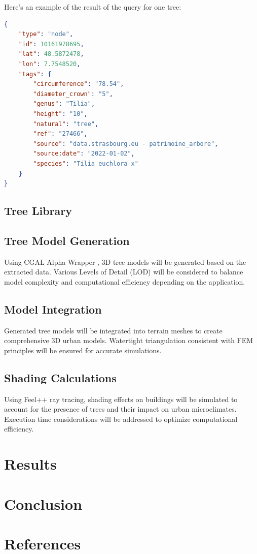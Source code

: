 \documentclass[12pt]{article}
\begin{document}
\newpage
Here's an example of the result of the query for one tree:

\begin{lstlisting}[language=json,firstnumber=1]
{
    "type": "node",
    "id": 10161978695,
    "lat": 48.5872478,
    "lon": 7.7548520,
    "tags": {
        "circumference": "78.54",
        "diameter_crown": "5",
        "genus": "Tilia",
        "height": "10",
        "natural": "tree",
        "ref": "27466",
        "source": "data.strasbourg.eu - patrimoine_arbore",
        "source:date": "2022-01-02",
        "species": "Tilia euchlora x"
    }
}
\end{lstlisting}

\subsection{Tree Library}

\subsection{Tree Model Generation}
Using CGAL Alpha Wrapper \cite{cgal_alpha_wrapper}, 3D tree models will be generated based on the extracted data. Various 
Levels of Detail (LOD) will be considered to balance model complexity and computational 
efficiency depending on the application.

\subsection{Model Integration}
Generated tree models will be integrated into terrain meshes to create comprehensive 
3D urban models. Watertight triangulation consistent with FEM principles will be ensured 
for accurate simulations.

\subsection{Shading Calculations}
Using Feel++ ray tracing, shading effects on buildings will be simulated to account for the presence 
of trees and their impact on urban microclimates. Execution time considerations will be 
addressed to optimize computational efficiency.

\newpage

\section{Results}


\newpage

\section{Conclusion}


\newpage

\section{References}


\end{document}
